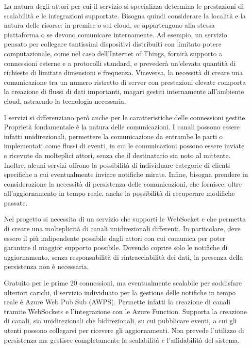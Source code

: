 La natura degli attori per cui il servizio si specializza determina le prestazioni di scalabilità e le integrazioni supportate. Bisogna quindi considerare la località e la natura delle risorse: in-premise o sul cloud, se appartengono alla stessa piattaforma o se devono comunicare internamente.
Ad esempio, un servizio pensato per collegare tantissimi dispositivi distribuiti con limitato potere computazionale, come nel caso dell’Internet of Things, fornirà  supporto a connessioni esterne e a protocolli standard, e prevederà un’elevata quantità di richieste di limitate dimensioni e frequenza. Viceversa, la necessità di creare una comunicazione tra un numero ristretto di server con prestazioni elevate comporta la creazione di flussi di dati importanti, magari gestiti internamente all’ambiente cloud, astraendo la tecnologia necessaria.

I servizi si differenziano però anche per le caratteristiche delle connessioni gestite.
Proprietà fondamentale è la natura delle comunicazioni. I canali possono essere infatti unidirezionali, permettere la comunicazione da entrambe le parti o implementati come flussi di eventi, in cui le comunicazioni possono essere inviate e ricevute da molteplici attori, senza che il destinatario sia noto al mittente. Inoltre, alcuni servizi offrono la possibilità di individuare categorie di clienti specifiche a cui eventualmente inviare notifiche mirate. Infine, bisogna prendere in considerazione la necessità di persistenza delle comunicazioni, che fornisce, oltre all’aggiornamento in tempo reale, anche la possibilità di recuperare modifiche passate.

Nel progetto si necessita di un servizio che supporti le WebSocket e che permetta di creare una molteplicità di canali unidirezionali differenti. In particolare, deve essere il più indipendente possibile dagli attori con cui comunica per poter garantire il maggior supporto possibile. Dovendo coprire solo le notifiche di aggiornamento, senza responsabilità di rintracciabilità dei dati, la presenza della persistenza non è necessaria.

Gratuito per le prime 20 connessioni, ma eventualmente scalabile per soddisfare ulteriori carichi, il servizio individuato per la gestione delle notifiche in tempo reale è Azure Web Pub Sub (AWPS). Permette infatti la creazione di canali tramite WebSockets e l’integrazione con le Azure Function. Supporta la creazione di canali, sia unidirezionali che bidirezionali, su cui pubblicare eventi, a cui gli utenti possono collegarsi per ricevere gli aggiornamenti. Non prevede l’utilizzo di persistenza ma gestisce completamente la scalabilità e l’affidabilità del sistema.



